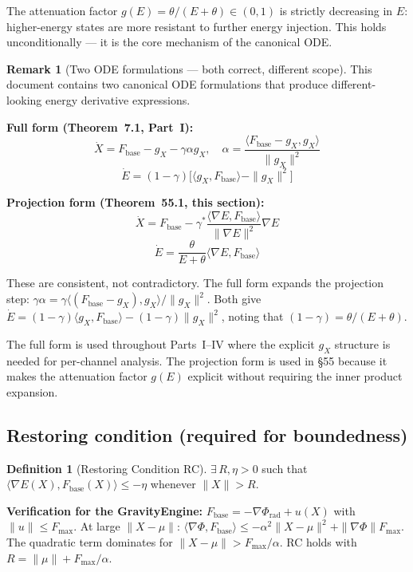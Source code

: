 \documentclass[11pt,a4paper]{article}
\theoremstyle{definition}
\newtheorem{definition}[theorem]{Definition}
\newtheorem{remark}[theorem]{Remark}
\newcommand{\Fbase}{F_{\mathrm{base}}}
\newcommand{\gX}{g_X}
\begin{document}
\noindent
The attenuation factor $g(E) = \theta/(E+\theta)\in(0,1)$ is strictly decreasing
in $E$: higher-energy states are more resistant to further energy injection.
This holds unconditionally --- it is the core mechanism of the canonical ODE.

\begin{remark}[Two ODE formulations --- both correct, different scope]
\label{rem:two-odes}
This document contains two canonical ODE formulations that produce different-looking
energy derivative expressions.

\textbf{Full form (Theorem~7.1, Part~I):}
\[
\dot X = \Fbase - \gX - \gamma\alpha\gX, \quad
\alpha = \frac{\langle\Fbase - \gX, \gX\rangle}{\|\gX\|^2}
\]
\[
\dot E = (1-\gamma)\bigl[\langle\gX,\Fbase\rangle - \|\gX\|^2\bigr]
\]

\textbf{Projection form (Theorem~55.1, this section):}
\[
\dot X = \Fbase - \gamma^*\frac{\langle\nabla E,\Fbase\rangle}{\|\nabla E\|^2}\nabla E
\]
\[
\dot E = \frac{\theta}{E+\theta}\langle\nabla E,\Fbase\rangle
\]

These are consistent, not contradictory. The full form expands the projection step:
$\gamma\alpha = \gamma\langle(\Fbase-\gX),\gX\rangle/\|\gX\|^2$. Both give
$\dot E = (1-\gamma)\langle\gX,\Fbase\rangle - (1-\gamma)\|\gX\|^2$,
noting that $(1-\gamma) = \theta/(E+\theta)$.

The full form is used throughout Parts~I--IV where the explicit $\gX$ structure
is needed for per-channel analysis.
The projection form is used in §55 because it makes the attenuation factor
$g(E)$ explicit without requiring the inner product expansion.
\end{remark}

\subsection{Restoring condition (required for boundedness)}

\begin{definition}[Restoring Condition RC]
$\exists\,R,\eta>0$ such that
$\langle\nabla E(X),\Fbase(X)\rangle \leq -\eta$ whenever $\|X\|>R$.
\end{definition}

\noindent
\textbf{Verification for the GravityEngine:}
$\Fbase = -\nabla\Phi_\mathrm{rad} + u(X)$ with $\|u\|\leq F_\mathrm{max}$.
At large $\|X-\mu\|$: $\langle\nabla\Phi,\Fbase\rangle \leq -\alpha^2\|X-\mu\|^2
+ \|\nabla\Phi\|F_\mathrm{max}$.
The quadratic term dominates for $\|X-\mu\|>F_\mathrm{max}/\alpha$.
RC holds with $R = \|\mu\| + F_\mathrm{max}/\alpha$.
\end{document}
